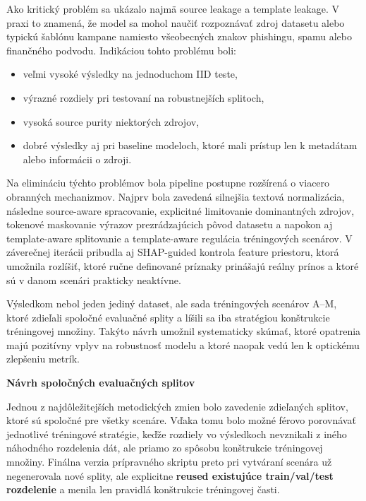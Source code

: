 \documentclass[conference]{IEEEtran}
\begin{document}
Ako kritický problém sa ukázalo najmä source leakage a template leakage. V praxi to znamená, že model sa mohol naučiť rozpoznávať zdroj datasetu alebo typickú šablónu kampane namiesto všeobecných znakov phishingu, spamu alebo finančného podvodu. Indikáciou tohto problému boli:
\begin{itemize}
    \item veľmi vysoké výsledky na jednoduchom IID teste,
    \item výrazné rozdiely pri testovaní na robustnejších splitoch,
    \item vysoká source purity niektorých zdrojov,
    \item dobré výsledky aj pri baseline modeloch, ktoré mali prístup len k metadátam alebo informácii o zdroji.
\end{itemize}

Na elimináciu týchto problémov bola pipeline postupne rozšírená o viacero obranných mechanizmov. Najprv bola zavedená silnejšia textová normalizácia, následne source-aware spracovanie, explicitné limitovanie dominantných zdrojov, tokenové maskovanie výrazov prezrádzajúcich pôvod datasetu a napokon aj template-aware splitovanie a template-aware regulácia tréningových scenárov. V záverečnej iterácii pribudla aj SHAP-guided kontrola feature priestoru, ktorá umožnila rozlíšiť, ktoré ručne definované príznaky prinášajú reálny prínos a ktoré sú v danom scenári prakticky neaktívne.

Výsledkom nebol jeden jediný dataset, ale sada tréningových scenárov A–M, ktoré zdieľali spoločné evaluačné splity a líšili sa iba stratégiou konštrukcie tréningovej množiny. Takýto návrh umožnil systematicky skúmať, ktoré opatrenia majú pozitívny vplyv na robustnosť modelu a ktoré naopak vedú len k optickému zlepšeniu metrík.

\textbf{Návrh spoločných evaluačných splitov}

Jednou z najdôležitejších metodických zmien bolo zavedenie zdieľaných splitov, ktoré sú spoločné pre všetky scenáre. Vďaka tomu bolo možné férovo porovnávať jednotlivé tréningové stratégie, keďže rozdiely vo výsledkoch nevznikali z iného náhodného rozdelenia dát, ale priamo zo spôsobu konštrukcie tréningovej množiny. Finálna verzia prípravného skriptu preto pri vytváraní scenára už negenerovala nové splity, ale explicitne \textbf{reused existujúce train/val/test rozdelenie} a menila len pravidlá konštrukcie tréningovej časti.
\end{document}
